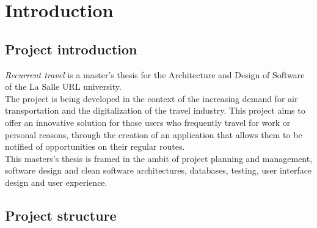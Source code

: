 \documentclass[../memory.tex]{subfiles}
\begin{document}
\chapter{Introduction}
\section{Project introduction}
\emph{Recurrent travel} is a master's thesis for the Architecture and Design of
Software of the La Salle URL university.
\\
The project is being developed in the context of the increasing demand for air
transportation and the digitalization of the travel industry. This project aims
to offer an innovative solution for those users who frequently travel for work
or personal reasons, through the creation of an application that allows them to
be notified of opportunities on their regular routes.
\\[8pt]
This masters's thesis is framed in the ambit of project planning and management,
software design and clean software architectures, databases, testing, user
interface design and user experience.
\section{Project structure}
\end{document}
